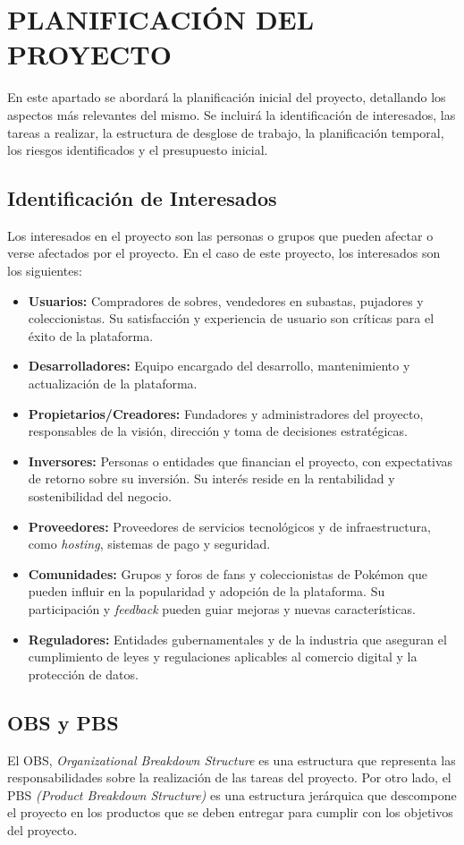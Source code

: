 \section{PLANIFICACIÓN DEL PROYECTO}
En este apartado se abordará la planificación inicial del proyecto, detallando los aspectos más relevantes del mismo. 
Se incluirá la identificación de interesados, las tareas a realizar, la estructura de desglose de trabajo, la planificación temporal, los riesgos identificados y el presupuesto inicial.

\subsection{Identificación de Interesados}
Los interesados en el proyecto son las personas o grupos que pueden afectar o verse afectados por el proyecto. 
En el caso de este proyecto, los interesados son los siguientes:
\begin{itemize}
    \item \textbf{Usuarios:} Compradores de sobres, vendedores en subastas, pujadores y coleccionistas. Su satisfacción y experiencia de usuario son críticas para el éxito de la plataforma.
    \item \textbf{Desarrolladores:} Equipo encargado del desarrollo, mantenimiento y actualización de la plataforma.
    \item \textbf{Propietarios/Creadores:} Fundadores y administradores del proyecto, responsables de la visión, dirección y toma de decisiones estratégicas.
    \item \textbf{Inversores:} Personas o entidades que financian el proyecto, con expectativas de retorno sobre su inversión. Su interés reside en la rentabilidad y sostenibilidad del negocio.
    \item \textbf{Proveedores:} Proveedores de servicios tecnológicos y de infraestructura, como \textit{hosting}, sistemas de pago y seguridad.
    \item \textbf{Comunidades:} Grupos y foros de fans y coleccionistas de Pokémon que pueden influir en la popularidad y adopción de la plataforma. Su participación y \textit{feedback} pueden guiar mejoras y nuevas características.
    \item \textbf{Reguladores:} Entidades gubernamentales y de la industria que aseguran el cumplimiento de leyes y regulaciones aplicables al comercio digital y la protección de datos.
\end{itemize}


\subsection{OBS y PBS}
El OBS, \textit{Organizational Breakdown Structure} es una estructura que representa las responsabilidades sobre la realización de las tareas del proyecto. 
Por otro lado, el PBS  \textit{(Product Breakdown Structure)} es una estructura jerárquica que descompone el proyecto en los productos que se deben entregar para cumplir con los objetivos del proyecto.

